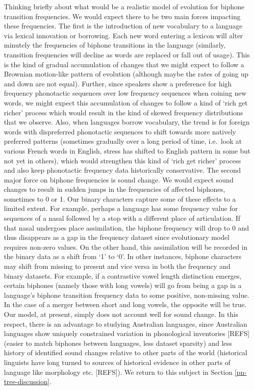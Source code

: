 Thinking briefly about what would be a realistic model of evolution for biphone transition frequencies. We would expect there to be two main forces impacting these frequencies. The first is the introduction of new vocabulary to a language via lexical innovation or borrowing. Each new word entering a lexicon will alter minutely the frequencies of biphone transitions in the language (similarly, transition frequencies will decline as words are replaced or fall out of usage). This is the kind of gradual accumulation of changes that we might expect to follow a Brownian motion-like pattern of evolution (although maybe the rates of going up and down are not equal). Further, since speakers show a preference for high frequency phonotactic sequences over low frequency sequences when coining new words, we might expect this accumulation of changes to follow a kind of `rich get richer' process which would result in the kind of skewed frequency distributions that we observe. Also, when languages borrow vocabulary, the trend is for foreign words with dispreferred phonotactic sequences to shift towards more natively preferred patterns (sometimes gradually over a long period of time, i.e.~look at various French words in English, stress has shifted to English pattern in some but not yet in others), which would strengthen this kind of `rich get richer' process and also keep phonotactic frequency data historically conservative. The second major force on biphone frequencies is sound change. We would expect sound changes to result in sudden jumps in the frequencies of affected biphones, sometimes to 0 or 1. Our binary characters capture some of these effects to a limited extent. For example, perhaps a language has some frequency value for sequences of a nasal followed by a stop with a different place of articulation. If that nasal undergoes place assimilation, the biphone frequency will drop to 0 and thus disappears as a gap in the frequency dataset since evolutionary model requires non-zero values. On the other hand, this assimilation will be recorded in the binary data as a shift from `1' to `0'. In other instances, biphone characters may shift from missing to present and vice versa in both the frequency and binary datasets. For example, if a contrastive vowel length distinction emerges, certain biphones (namely those with long vowels) will go from being a gap in a language's biphone transition frequency data to some positive, non-missing value. In the case of a merger between short and long vowels, the opposite will be true. Our model, at present, simply does not account well for sound change. In this respect, there is an advantage to studying Australian languages, since Australian languages show uniquely constrained variation in phonological inventories {[}REFS{]} (easier to match biphones between languages, less dataset sparsity) and less history of identified sound changes relative to other parts of the world (historical linguists have long turned to sources of historical evidence in other parts of language like morphology etc. {[}REFS{]}). We return to this subject in Section \ref{pn-tree-discussion}.

